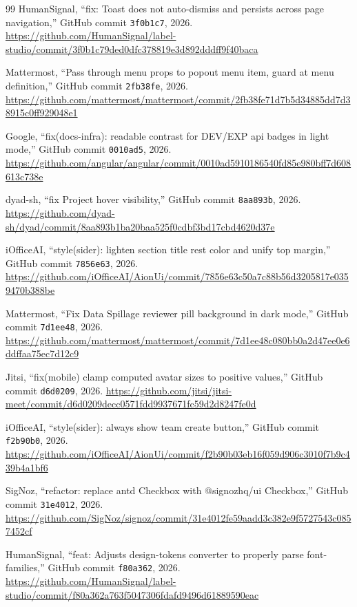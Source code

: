\documentclass{article}
\begin{document}
\begin{thebibliography}{99}
{HumanSignal},
``fix: Toast does not auto-dismiss and persists across page navigation,''
GitHub commit \texttt{3f0b1c7}, 2026.
\url{https://github.com/HumanSignal/label-studio/commit/3f0b1c79ded0dfc378819e3d892dddff9f40baca}

{Mattermost},
``Pass through menu props to popout menu item, guard at menu definition,''
GitHub commit \texttt{2fb38fe}, 2026.
\url{https://github.com/mattermost/mattermost/commit/2fb38fe71d7b5d34885dd7d38915c0ff929048e1}

{Google},
``fix(docs-infra): readable contrast for DEV/EXP api badges in light mode,''
GitHub commit \texttt{0010ad5}, 2026.
\url{https://github.com/angular/angular/commit/0010ad5910186540fd85e980bff7d608613c738e}

{dyad-sh},
``fix Project hover visibility,''
GitHub commit \texttt{8aa893b}, 2026.
\url{https://github.com/dyad-sh/dyad/commit/8aa893b1ba20baa525f0cdbf3bd17cbd4620d37e}

{iOfficeAI},
``style(sider): lighten section title rest color and unify top margin,''
GitHub commit \texttt{7856e63}, 2026.
\url{https://github.com/iOfficeAI/AionUi/commit/7856e63c50a7c88b56d3205817e0359470b388be}

{Mattermost},
``Fix Data Spillage reviewer pill background in dark mode,''
GitHub commit \texttt{7d1ee48}, 2026.
\url{https://github.com/mattermost/mattermost/commit/7d1ee48c080bb0a2d47ee0e6ddffaa75ec7d12c9}

{Jitsi},
``fix(mobile) clamp computed avatar sizes to positive values,''
GitHub commit \texttt{d6d0209}, 2026.
\url{https://github.com/jitsi/jitsi-meet/commit/d6d0209decc0571fdd9937671fc59d2d8247fe0d}

{iOfficeAI},
``style(sider): always show team create button,''
GitHub commit \texttt{f2b90b0}, 2026.
\url{https://github.com/iOfficeAI/AionUi/commit/f2b90b03eb16f059d906c3010f7b9c439b4a1bf6}

{SigNoz},
``refactor: replace antd Checkbox with @signozhq/ui Checkbox,''
GitHub commit \texttt{31e4012}, 2026.
\url{https://github.com/SigNoz/signoz/commit/31e4012fe59aadd3c382e9f5727543c0857452cf}

{HumanSignal},
``feat: Adjusts design-tokens converter to properly parse font-families,''
GitHub commit \texttt{f80a362}, 2026.
\url{https://github.com/HumanSignal/label-studio/commit/f80a362a763f5047306fdafd9496d61889590eac}


\end{thebibliography}
\end{document}
